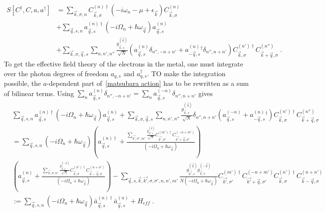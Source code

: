 \documentclass{article}
\begin{document}
\begin{align}
    S[C^{\dagger},C,a,a^{\dagger}] &= \sum_{\vec{k},\sigma, n} C^{(n)\dagger}_{\vec{k},\sigma}\left(-i\omega_n - \mu + \epsilon_{\vec{k}}\right) C^{(n)}_{\vec{k},\sigma} \nonumber \\
                                   &+ \sum_{\vec{q},s,n} a^{(n)\dagger}_{\vec{q},s} \left(-i\Omega_n + \hbar \omega_{\vec{q}}\right) a^{(n)}_{\vec{q},s} \label{matsubara action} \\
                                   &+ \sum_{\vec{k},\sigma,\vec{q},s} \sum_{n,n',n''} \frac{g_{\vec{k},s}^{(\vec{q})}}{\sqrt{N}} \left(a^{(n)}_{\vec{q},s} \delta_{n'', -n + n'} + a^{(n)}_{-\vec{q}, s}^{\dagger}  \delta_{n'',n + n'}\right) C^{(n')\dagger}_{\vec{k},\sigma}C^{(n'')}_{\vec{k} + \vec{q},\sigma}\;.\nonumber
\end{align}
To get the effective field theory of the electrons in the metal, one must integrate over the photon degrees of freedom $a_{q,s}$ and $a_{q,s}^{\dagger}$. TO make the integration possible, the $a$-dependent part of~\cref{matsubara action} has to be rewritten as a sum of bilinear terms. Using $\sum_n a^{(n)}_{\vec{q},s} \delta_{n'', -n + n'} = \sum_n a^{(-n)}_{\vec{q},s} \delta_{n'', n + n'}$ gives
\begin{align}
     &\sum_{\vec{q},s,n} a^{(n)\dagger}_{\vec{q},s} \left(-i\Omega_n + \hbar \omega_{\vec{q}}\right) a^{(n)}_{\vec{q},s} + \sum_{\vec{k},\sigma,\vec{q},s} \sum_{n,n',n''} \frac{g_{\vec{k},s}^{(\vec{q})}}{\sqrt{N}} \delta_{n'',n + n'} \left(a^{(-n)}_{\vec{q},s} + a^{(n)}_{-\vec{q}, s}^{\dagger}\right) C^{(n')\dagger}_{\vec{k},\sigma}C^{(n'')}_{\vec{k} + \vec{q},\sigma}\nonumber \\
     &= \sum_{\vec{q},s,n} \left(-i\Omega_n + \hbar \omega_{\vec{q}}\right)  \left(a^{(n)\dagger}_{\vec{q},s} + \frac{\sum_{\vec{k'},\sigma', m'} \frac{g_{\vec{k'},s}^{(\vec{q})}}{\sqrt{N}} C^{(m')\dagger}_{\vec{k'},\sigma'}C^{(-n + m')}_{\vec{k'} + \vec{q},\sigma'} }{\left(-i\Omega_n + \hbar \omega_{\vec{q}}\right)} \right) \label{rewriting action}\\
     & \left(a^{(n)}_{\vec{q},s} + \frac{\sum_{\vec{k},\sigma, n'} \frac{g_{\vec{k},s}^{(-\vec{q})}}{\sqrt{N}} C^{(n')\dagger}_{\vec{k},\sigma}C^{(n + n')}_{\vec{k} - \vec{q},\sigma} }{\left(-i\Omega_{n} + \hbar \omega_{\vec{q}}\right)}\right)
     -\sum_{\vec{q},s,\vec{k},\vec{k'},\sigma,\sigma', n, n', m'} \frac{g_{\vec{k'},s}^{(\vec{q})} g_{\vec{k},s}^{(-\vec{q})}  }{N\left(-i\Omega_n + \hbar \omega_{\vec{q}}\right)}
      C^{(m')\dagger}_{\vec{k'},\sigma'}C^{(-n + m')}_{\vec{k'} + \vec{q},\sigma'} C^{(n')\dagger}_{\vec{k},\sigma}C^{(n + n')}_{\vec{k} - \vec{q},\sigma}\nonumber \\
     &:= \sum_{\vec{q},s,n} \left(-i\Omega_n + \hbar \omega_{\vec{q}}\right)  \bar{a}^{(n)\dagger}_{\vec{q},s}\bar{a}^{(n)}_{\vec{q},s} + H_{eff}\;.\nonumber \\
\end{align}
\end{document}
